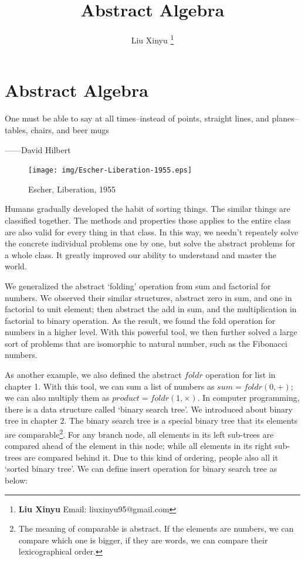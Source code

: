 \documentclass{article}
\begin{document}
\title{Abstract Algebra}

\author{Liu Xinyu
\thanks{{\bfseries Liu Xinyu} \newline
  Email: liuxinyu95@gmail.com \newline}}

\maketitle
\fi


\ifx\wholebook\relax
\chapter{Abstract Algebra}
\fi

\epigraph{One must be able to say at all times--instead of points, straight lines, and planes--tables, chairs, and beer mugs}{——David Hilbert}

\begin{figure}
 \centering
 \texttt{[image: img/Escher-Liberation-1955.eps]}
 \captionsetup{labelformat=empty}
 \caption{Escher, Liberation, 1955}
 \label{fig:Escher-liberation}
\end{figure}

Humans gradually developed the habit of sorting things. The similar things are classified together. The methods and properties those applies to the entire class are also valid for every thing in that class. In this way, we needn't repeately solve the concrete individual problems one by one, but solve the abstract problems for a whole class. It greatly improved our ability to understand and master the world.

We generalized the abstract `folding' operation from sum and factorial for numbers. We observed their similar structures, abstract zero in sum, and one in factorial to unit element; then abstract the add in sum, and the multiplication in factorial to binary operation. As the result, we found the fold operation for numbers in a higher level. With this powerful tool, we then further solved a large sort of problems that are isomorphic to natural number, such as the Fibonacci numbers.

As another example, we also defined the abstract $foldr$ operation for list in chapter 1. With this tool, we can sum a list of numbers as $sum = foldr(0, +)$; we can also multiply them as $product = foldr(1, \times)$. In computer programming, there is a data structure called `binary search tree'. We introduced about binary tree in chapter 2. The binary search tree is a special binary tree that its elements are comparable\footnote{The meaning of comparable is abstract. If the elements are numbers, we can compare which one is bigger, if they are words, we can compare their lexicographical order.}. For any branch node, all elements in its left sub-trees are compared ahead of the element in this node; while all elements in its right sub-trees are compared behind it. Due to this kind of ordering, people also all it `sorted binary tree'. We can define insert operation for binary search tree as below:
\end{document}

